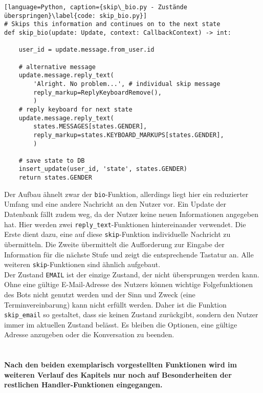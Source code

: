             \begin{lstlisting}[language=Python, caption={skip\_bio.py - Zustände überspringen}\label{code: skip_bio.py}]
# Skips this information and continues on to the next state
def skip_bio(update: Update, context: CallbackContext) -> int:
    
    user_id = update.message.from_user.id

    # alternative message
    update.message.reply_text(
        'Alright. No problem...', # individual skip message
        reply_markup=ReplyKeyboardRemove(),
        )
    # reply keyboard for next state
    update.message.reply_text(
        states.MESSAGES[states.GENDER],
        reply_markup=states.KEYBOARD_MARKUPS[states.GENDER],
        )    

    # save state to DB
    insert_update(user_id, 'state', states.GENDER)
    return states.GENDER
            \end{lstlisting}

                Der Aufbau ähnelt zwar der \verb|bio|-Funktion, allerdings liegt hier ein reduzierter Umfang und eine andere Nachricht an den Nutzer vor. Ein Update der Datenbank fällt zudem weg, da der Nutzer keine neuen Informationen angegeben hat. Hier werden zwei \verb|reply_text|-Funktionen hintereinander verwendet. Die Erste dient dazu, eine auf diese \verb|skip|-Funktion individuelle Nachricht zu übermitteln. Die Zweite  übermittelt die Aufforderung zur Eingabe der Information für die nächste Stufe und zeigt die entsprechende Tastatur an. Alle weiteren \verb|skip|-Funktionen sind ähnlich aufgebaut.\\
                Der Zustand \verb|EMAIL| ist der einzige Zustand, der nicht übersprungen werden kann. Ohne eine gültige E-Mail-Adresse des Nutzers können wichtige Folgefunktionen des Bots nicht genutzt werden und der Sinn und Zweck (eine Terminvereinbarung) kann nicht erfüllt werden. Daher ist die Funktion \verb|skip_email| so gestaltet, dass sie keinen Zustand zurückgibt, sondern den Nutzer immer im aktuellen Zustand belässt. Es bleiben die Optionen, eine gültige Adresse anzugeben oder die Konversation zu beenden.\\ \\

        \paragraph{Nach den beiden exemplarisch vorgestellten Funktionen wird im weiteren Verlauf des Kapitels nur noch auf Besonderheiten der restlichen Handler-Funktionen eingegangen.}

